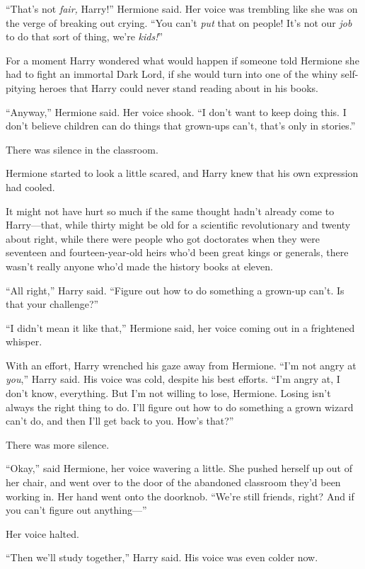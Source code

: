 “That’s not \emph{fair,} Harry!” Hermione said. Her voice was trembling like she was on the verge of breaking out crying. “You can’t \emph{put} that on people! It’s not our \emph{job} to do that sort of thing, we’re \emph{kids!}”

For a moment Harry wondered what would happen if someone told Hermione she had to fight an immortal Dark Lord, if she would turn into one of the whiny self-pitying heroes that Harry could never stand reading about in his books.

“Anyway,” Hermione said. Her voice shook. “I don’t want to keep doing this. I don’t believe children can do things that grown-ups can’t, that’s only in stories.”

There was silence in the classroom.

Hermione started to look a little scared, and Harry knew that his own expression had cooled.

It might not have hurt so much if the same thought hadn’t already come to Harry—that, while thirty might be old for a scientific revolutionary and twenty about right, while there were people who got doctorates when they were seventeen and fourteen-year-old heirs who’d been great kings or generals, there wasn’t really anyone who’d made the history books at eleven.

“All right,” Harry said. “Figure out how to do something a grown-up can’t. Is that your challenge?”

“I didn’t mean it like that,” Hermione said, her voice coming out in a frightened whisper.

With an effort, Harry wrenched his gaze away from Hermione. “I’m not angry at \emph{you},” Harry said. His voice was cold, despite his best efforts. “I’m angry at, I don’t know, everything. But I’m not willing to lose, Hermione. Losing isn’t always the right thing to do. I’ll figure out how to do something a grown wizard can’t do, and then I’ll get back to you. How’s that?”

There was more silence.

“Okay,” said Hermione, her voice wavering a little. She pushed herself up out of her chair, and went over to the door of the abandoned classroom they’d been working in. Her hand went onto the doorknob. “We’re still friends, right? And if you can’t figure out anything—”

Her voice halted.

“Then we’ll study together,” Harry said. His voice was even colder now.

